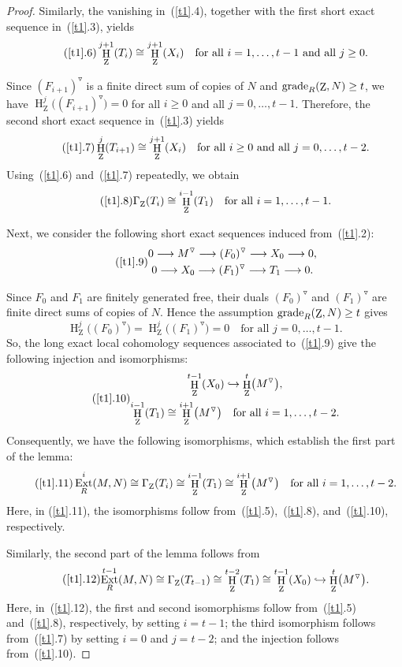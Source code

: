\documentclass[11pt]{amsart}
\theoremstyle{definition}
\theoremstyle{definition}
\numberwithin{equation}{section}
\DeclareMathOperator{\gr}{\textnormal{grade}}
\DeclareMathOperator{\mz}{Z}
\DeclareMathOperator{\Ext}{Ext}
\DeclareMathOperator{\hh}{H}
\begin{document}
\begin{proof}
Similarly, the vanishing in~(\ref{t1}.4), together with
the first short exact sequence in~(\ref{t1}.3), yields
\[
\tag{\ref{t1}.6}
\hh_{\mz}^{j+1}(T_i)
\cong\hh_{\mz}^{j+1}(X_i)
\quad\text{for all }i=1,\ldots,t-1
\text{ and all }j\geq0.
\]

Since $(F_{i+1})^{\triangledown}$ is a finite direct sum
of copies of $N$ and $\gr_R(\mz,N)\geq t$, we have
$\hh^j_{\mz}\big((F_{i+1})^{\triangledown}\big)=0$
for all $i\geq0$ and all $j=0,\ldots,t-1$. Therefore, the second short exact sequence
in~(\ref{t1}.3) yields
\[
\tag{\ref{t1}.7}
\hh_{\mz}^j(T_{i+1})
\cong\hh_{\mz}^{j+1}(X_i)
\quad\text{for all }i\geq0
\text{ and all }j=0,\ldots,t-2.
\]
Using~(\ref{t1}.6) and~(\ref{t1}.7) repeatedly, we obtain
\[
\tag{\ref{t1}.8}
\Gamma_{\mz}(T_i)
\cong\hh_{\mz}^{i-1}(T_1)
\quad\text{for all }i=1,\ldots,t-1.
\]

Next, we consider the following short exact sequences
induced from~(\ref{t1}.2):
\[
\tag{\ref{t1}.9}
\begin{gathered}
0\longrightarrow M^{\triangledown}
\longrightarrow(F_0)^{\triangledown}
\longrightarrow X_0
\longrightarrow0,\\
0\longrightarrow X_0
\longrightarrow(F_1)^{\triangledown}
\longrightarrow T_1
\longrightarrow0.
\end{gathered}
\]

Since $F_0$ and $F_1$ are finitely generated free,
their duals $(F_0)^{\triangledown}$ and
$(F_1)^{\triangledown}$ are finite direct sums of copies
of $N$. Hence the assumption $\gr_R(\mz,N)\geq t$ gives
\[
\hh^j_{\mz}\bigl((F_0)^{\triangledown}\bigr)
=\hh^j_{\mz}\bigl((F_1)^{\triangledown}\bigr)=0
\quad\text{for all }j=0,\ldots,t-1.
\]
So, the long exact local cohomology sequences associated
to~(\ref{t1}.9) give the following injection and isomorphisms:
\[
\tag{\ref{t1}.10}
\begin{gathered}
\hh_{\mz}^{t-1}(X_0)
\hookrightarrow
\hh_{\mz}^{t}\bigl(M^{\triangledown}\bigr),\\
\hh_{\mz}^{i-1}(T_1)
\cong
\hh_{\mz}^{i+1}\bigl(M^{\triangledown}\bigr)
\quad\text{for all }i=1,\ldots,t-2.
\end{gathered}
\]
Consequently, we have the following isomorphisms,
which establish the first part of the lemma:
\[
\tag{\ref{t1}.11}
\Ext^i_R(M,N)
\cong\Gamma_{\mz}(T_i)
\cong\hh_{\mz}^{i-1}(T_1)
\cong\hh_{\mz}^{i+1}\bigl(M^{\triangledown}\bigr)
\quad\text{for all } i=1,\ldots,t-2.
\]
Here, in (\ref{t1}.11), the isomorphisms follow from~(\ref{t1}.5),~(\ref{t1}.8), and~(\ref{t1}.10), respectively.

Similarly, the second part of the lemma follows from
\[
\tag{\ref{t1}.12}
\begin{aligned}
\Ext^{t-1}_R(M,N) \cong\Gamma_{\mz}(T_{t-1})
\cong\hh_{\mz}^{t-2}(T_1)
\cong\hh_{\mz}^{t-1}(X_0)
\hookrightarrow
\hh_{\mz}^{t}\bigl(M^{\triangledown}\bigr).
\end{aligned}
\]
Here, in~(\ref{t1}.12), the first and second isomorphisms follow
from~(\ref{t1}.5) and~(\ref{t1}.8), respectively,
by setting $i=t-1$; the third isomorphism follows from~(\ref{t1}.7)
by setting $i=0$ and $j=t-2$; and the injection follows from~(\ref{t1}.10).
\end{proof}
\end{document}
